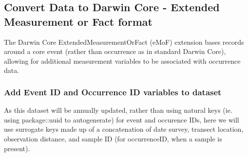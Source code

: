 \documentclass[
]{book}
\newenvironment{Shaded}{\begin{snugshade}}{\end{snugshade}}
\newcommand{\AttributeTok}[1]{\textcolor[rgb]{0.77,0.63,0.00}{#1}}
\newcommand{\CommentTok}[1]{\textcolor[rgb]{0.56,0.35,0.01}{\textit{#1}}}
\newcommand{\DocumentationTok}[1]{\textcolor[rgb]{0.56,0.35,0.01}{\textbf{\textit{#1}}}}
\newcommand{\FunctionTok}[1]{\textcolor[rgb]{0.00,0.00,0.00}{#1}}
\newcommand{\NormalTok}[1]{#1}
\newcommand{\OtherTok}[1]{\textcolor[rgb]{0.56,0.35,0.01}{#1}}
\newcommand{\SpecialCharTok}[1]{\textcolor[rgb]{0.00,0.00,0.00}{#1}}
\newcommand{\StringTok}[1]{\textcolor[rgb]{0.31,0.60,0.02}{#1}}
\begin{document}
\hypertarget{convert-data-to-darwin-core---extended-measurement-or-fact-format}{%
\subsection{Convert Data to Darwin Core - Extended Measurement or Fact format}\label{convert-data-to-darwin-core---extended-measurement-or-fact-format}}

The Darwin Core ExtendedMeasurementOrFact (eMoF) extension bases records
around a core event (rather than occurrence as in standard Darwin Core),
allowing for additional measurement variables to be associated with
occurrence data.

\hypertarget{add-event-id-and-occurrence-id-variables-to-dataset}{%
\subsubsection{Add Event ID and Occurrence ID variables to dataset}\label{add-event-id-and-occurrence-id-variables-to-dataset}}

As this dataset will be annually updated, rather than using
natural keys (ie. using package::uuid to autogenerate) for event and
occurence IDs, here we will use surrogate keys made up of a concatenation
of date survey, transect location, observation distance, and sample ID
(for occurrenceID, when a sample is present).

\begin{Shaded}
\end{Shaded}
\end{document}
